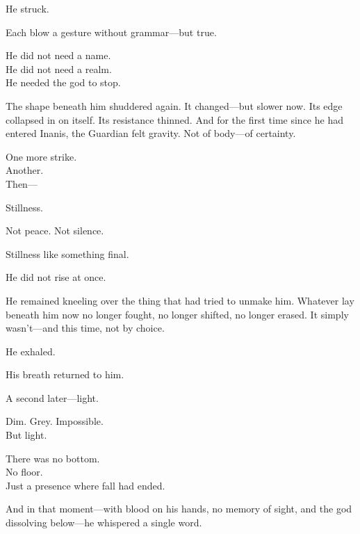 \documentclass[9pt]{article}
\begin{document}
\vspace{0.5em}
He struck.

\vspace{0.5em}
Each blow a gesture without grammar---but true.

\vspace{0.5em}
He did not need a name.\\
He did not need a realm.\\
He needed the god to stop.

\vspace{0.5em}
The shape beneath him shuddered again. It changed---but slower now. Its edge collapsed in on itself. Its resistance thinned. And for the first time since he had entered Inanis, the Guardian felt gravity. Not of body---of certainty.

\vspace{0.5em}
One more strike.\\
Another.\\
Then---

\vspace{0.5em}
Stillness.

\vspace{0.5em}
Not peace. Not silence.

\vspace{0.5em}
Stillness like something final.

\vspace{0.5em}
He did not rise at once.

\vspace{0.5em}
He remained kneeling over the thing that had tried to unmake him. Whatever lay beneath him now no longer fought, no longer shifted, no longer erased. It simply wasn’t---and this time, not by choice.

\vspace{0.5em}
He exhaled.

\vspace{0.5em}
His breath returned to him.

\vspace{0.5em}
A second later---light.

\vspace{0.5em}
Dim. Grey. Impossible.\\
But light.

\vspace{0.5em}
There was no bottom.\\
No floor.\\
Just a presence where fall had ended.

\vspace{0.5em}
And in that moment---with blood on his hands, no memory of sight, and the god dissolving below---he whispered a single word.
\end{document}
